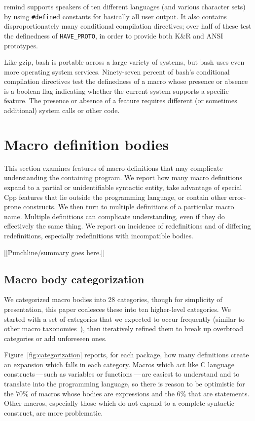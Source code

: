 \documentclass[10pt]{article}
\newcommand{\pkg}[1]{\textsf{#1}}
\begin{document}
\pkg{remind} supports speakers of ten different languages (and various
character sets) by using {\tt \#define}d constants for basically all user
output.  It also contains disproportionately many conditional compilation
directives; over half of these test the definedness of \verb|HAVE_PROTO|,
in order to provide both K\&R and ANSI prototypes.

Like \pkg{gzip}, \pkg{bash} is portable across a large variety of
systems, but \pkg{bash} uses even more operating system services.
Ninety-seven percent of \pkg{bash}'s conditional compilation directives
test the definedness of a macro whose presence or absence is a boolean
flag indicating whether the current system supports a specific feature.
The presence or absence of a feature requires different (or sometimes
additional) system calls or other code.


\section{Macro definition bodies}
\label{sec:categorization}

This section examines features of macro definitions that may complicate
understanding the containing program.  We report how many macro definitions
expand to a partial or unidentifiable syntactic entity, take advantage of
special Cpp features that lie outside the programming language, or contain
other error-prone constructs.  We then turn to multiple definitions of a
particular macro name.  Multiple definitions can complicate understanding,
even if they do effectively the same thing.  We report on incidence of
redefinitions and of differing redefinitions, especially redefinitions with
incompatible bodies.

[[Punchline/summary goes here.]]



\subsection{Macro body categorization}

We categorized macro bodies into 28 categories, though for simplicity of
presentation, this paper coalesces these into ten higher-level categories.
We started with a set of categories that we expected to occur frequently
(similar to other macro
taxonomies~\cite{Stroustrup-DesignEvolution,Carroll95}), then iteratively
refined them to break up overbroad categories or add unforeseen ones.

Figure~\ref{fig:categorization} reports, for each package, how many
definitions create an expansion which falls in each category.  Macros which
act like C language constructs\,---\,such as variables or
functions\,---\,are easiest to understand and to translate into the
programming language, so there is reason to be optimistic for the 70\% of
macros whose bodies are expressions and the 6\% that are statements.  Other
macros, especially those which do not expand to a complete syntactic
construct, are more problematic.
\end{document}

